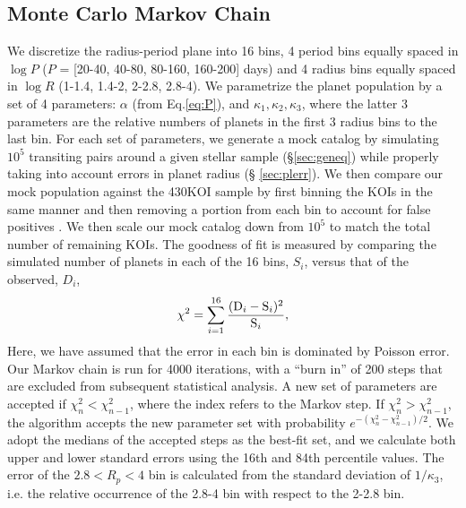 \subsection{Monte Carlo Markov Chain}
\label{sec:mcmc}
We discretize the radius-period plane into 16 bins, 4 period bins
equally spaced in $\log P$ ($P$ = [20-40, 40-80, 80-160, 160-200]
days) and 4 radius bins equally spaced in $\log R$ (1-1.4\rearth{},
1.4-2\rearth{}, 2-2.8\rearth{}, 2.8-4\rearth{}). We parametrize the
planet population by a set of 4 parameters: $\alpha$ (from
Eq.\ref{eq:P}), and $\kappa_1, \kappa_2, \kappa_3$, where the
latter 3 parameters are the relative numbers of planets in the first
3 radius bins to the last bin. For each set of
parameters, we generate a mock catalog by simulating $10^5$
transiting pairs around a given stellar sample (\S \ref{sec:geneq})
while properly taking into account errors in planet radius (\S
\ref{sec:plerr}).  We then compare our mock population against
the 430KOI sample by first binning the KOIs in the same manner and then removing 
a portion from each bin to account for false positives 
\citep[Table 1 from][]{Fressin2013}. We then scale our mock catalog 
down from $10^5$ to match the total number of remaining KOIs. 
The goodness of fit is measured by comparing the simulated number of
planets in each of the 16 bins, $S_i$, versus that of the
observed, $D_i$,
\begin{equation}
\chi^2=\sum\limits_{i=1}^{16} \frac{({\rm D}_i - {\rm S}_i)^2}{{\rm S}_i}, 
\end{equation}
Here, we have assumed that the error in each bin is dominated by 
Poisson error. Our Markov chain is run for 4000 iterations, with a
``burn in'' of 200 steps that are excluded from subsequent statistical 
analysis. A new set of parameters are accepted if $\chi^2_{n} <
\chi^2_{n-1}$, where the index refers to the Markov step.  If
$\chi^2_{n} > \chi^2_{n-1}$, the algorithm accepts the new parameter
set with probability $e^{-(\chi^2_{n} - \chi^2_{n-1})/2}$.  We 
adopt the medians of the accepted steps as the best-fit set, and we
calculate both upper and lower standard errors using the
16th and 84th percentile values. The error of the $2.8<R_p<4$ bin 
is calculated from the standard deviation of $1/\kappa_3$, i.e. 
the relative occurrence of the 2.8-4\rearth{} bin with respect to 
the 2-2.8\rearth{} bin.

